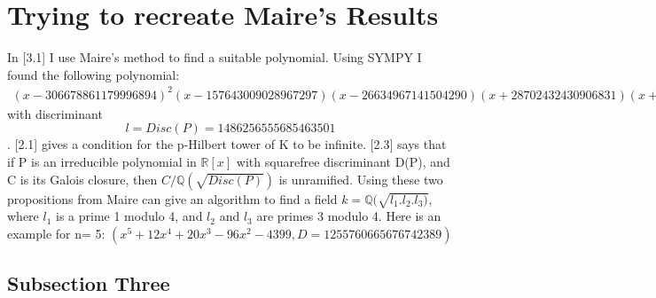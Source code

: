 \documentclass[preprint,12pt]{elsarticle}
\begin{document}
\section{Trying to recreate Maire's Results}
In \cite{MAIR}[3.1] I use Maire's method to find a suitable polynomial. 
Using SYMPY I found the following polynomial:
\newline
\begin{equation*}\label{eq:soln mle2}
  \begin{aligned}
(x - 306678861179996894)^{2}(x - 157643009028967297)
(x - 26634967141504290)(x + 28702432430906831)(x + 379563374979692451)(x +389369891119866095)
 \end{aligned}
\end{equation*}
\newline
with discriminant \[l = Disc(P) = 1486256555685463501\].
\newline
\cite{MAIR}[2.1] gives a condition for the p-Hilbert tower of K to be infinite. 
\newline
\cite{MAIR}[2.3] says that if P is an irreducible polynomial in $\mathbb{R}[x]$ with squarefree discriminant D(P), and C is its Galois closure, then $C/\mathbb{Q}(\sqrt{Disc(P)})$ is unramified.
\newline
Using these two propositions from Maire can give an algorithm to find a field $k=\mathbb{Q}(\sqrt{l_1.l_2.l_3)}$, where $l_1$ is a prime 1 modulo 4, and $l_2$ and $l_3$ are primes 3 modulo 4. 
\newline
Here is an example for n= 5:
$(x^5 + 12x^4 + 20x^3 - 96x^2 - 4399, D=1255760665676742389)$


\label{S:2}
\subsection{Subsection Three}
\end{document}
